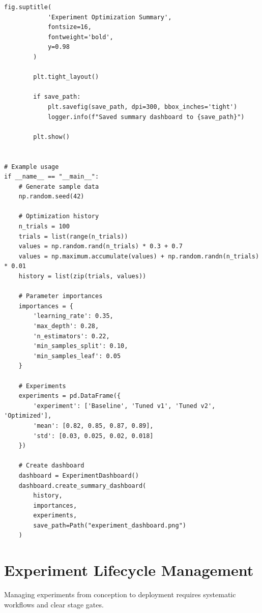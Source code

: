 \begin{lstlisting}[style=python, caption={Experiment dashboard generation}]
        fig.suptitle(
            'Experiment Optimization Summary',
            fontsize=16,
            fontweight='bold',
            y=0.98
        )

        plt.tight_layout()

        if save_path:
            plt.savefig(save_path, dpi=300, bbox_inches='tight')
            logger.info(f"Saved summary dashboard to {save_path}")

        plt.show()


# Example usage
if __name__ == "__main__":
    # Generate sample data
    np.random.seed(42)

    # Optimization history
    n_trials = 100
    trials = list(range(n_trials))
    values = np.random.rand(n_trials) * 0.3 + 0.7
    values = np.maximum.accumulate(values) + np.random.randn(n_trials) * 0.01
    history = list(zip(trials, values))

    # Parameter importances
    importances = {
        'learning_rate': 0.35,
        'max_depth': 0.28,
        'n_estimators': 0.22,
        'min_samples_split': 0.10,
        'min_samples_leaf': 0.05
    }

    # Experiments
    experiments = pd.DataFrame({
        'experiment': ['Baseline', 'Tuned v1', 'Tuned v2', 'Optimized'],
        'mean': [0.82, 0.85, 0.87, 0.89],
        'std': [0.03, 0.025, 0.02, 0.018]
    })

    # Create dashboard
    dashboard = ExperimentDashboard()
    dashboard.create_summary_dashboard(
        history,
        importances,
        experiments,
        save_path=Path("experiment_dashboard.png")
    )
\end{lstlisting}

\section{Experiment Lifecycle Management}

Managing experiments from conception to deployment requires systematic workflows and clear stage gates.

